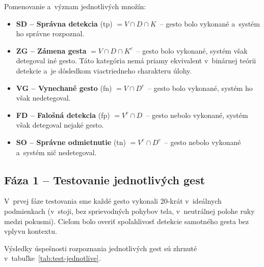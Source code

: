 \noindent Pomenovanie a~význam jednotlivých množín:

\begin{itemize}
  \item \textbf{SD -- Správna detekcia} (\Gls{tp})
        $= V \cap D \cap K$~-- gesto bolo vykonané
        a~systém ho správne rozpoznal.

  \item \textbf{ZG -- Zámena gesta}
        $= V \cap D \cap K^c$~-- gesto bolo vykonané,
        systém však detegoval iné gesto. Táto kategória
        nemá priamy ekvivalent v~binárnej teórii
        detekcie a~je dôsledkom viactriedneho
        charakteru úlohy.

  \item \textbf{VG -- Vynechané gesto} (\Gls{fn})
        $= V \cap D^c$~-- gesto bolo vykonané, systém
        ho však nedetegoval.

  \item \textbf{FD -- Falošná detekcia} (\Gls{fp})
        $= V^c \cap D$~-- gesto nebolo vykonané, systém
        však detegoval nejaké gesto.

  \item \textbf{SO -- Správne odmietnutie} (\Gls{tn})
        $= V^c \cap D^c$~-- gesto nebolo vykonané
        a~systém nič nedetegoval.
\end{itemize}

\subsection{Fáza 1 -- Testovanie jednotlivých gest}
\label{subsec:test-jednotlive}

V~prvej fáze testovania sme každé gesto vykonali
20-krát v~ideálnych podmienkach (v~stoji, bez
sprievodných pohybov tela, v~neutrálnej polohe ruky
medzi pokusmi). Cieľom bolo overiť spoľahlivosť
detekcie samotného gesta bez vplyvu kontextu.

Výsledky úspešnosti rozpoznania jednotlivých gest
sú zhrnuté v~tabuľke~\ref{tab:test-jednotlive}.

